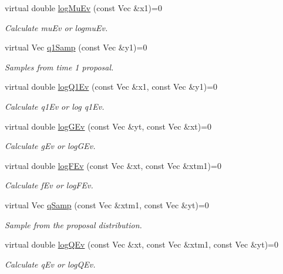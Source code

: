 \begin{DoxyCompactItemize}
virtual double \hyperlink{classSISRFilter_ab6ffa8e1cdee34f1afb825e35462afaa}{log\+Mu\+Ev} (const Vec \&x1)=0
\begin{DoxyCompactList}\small\item\em Calculate mu\+Ev or logmu\+Ev. \end{DoxyCompactList}\item 
virtual Vec \hyperlink{classSISRFilter_a5a57cd67535e31bb1ab20fb42499f911}{q1\+Samp} (const Vec \&y1)=0
\begin{DoxyCompactList}\small\item\em Samples from time 1 proposal. \end{DoxyCompactList}\item 
virtual double \hyperlink{classSISRFilter_a61a1971bd8208abbe3ccbacd66d35c23}{log\+Q1\+Ev} (const Vec \&x1, const Vec \&y1)=0
\begin{DoxyCompactList}\small\item\em Calculate q1\+Ev or log q1\+Ev. \end{DoxyCompactList}\item 
virtual double \hyperlink{classSISRFilter_aac59b077648fa74d2a5db970e3d7ffac}{log\+G\+Ev} (const Vec \&yt, const Vec \&xt)=0
\begin{DoxyCompactList}\small\item\em Calculate g\+Ev or log\+G\+Ev. \end{DoxyCompactList}\item 
virtual double \hyperlink{classSISRFilter_ab91474fc79efb84ed1dafbc8c542f59e}{log\+F\+Ev} (const Vec \&xt, const Vec \&xtm1)=0
\begin{DoxyCompactList}\small\item\em Calculate f\+Ev or log\+F\+Ev. \end{DoxyCompactList}\item 
virtual Vec \hyperlink{classSISRFilter_a2c480a10cac8b52a36ab1309cf9ea1a4}{q\+Samp} (const Vec \&xtm1, const Vec \&yt)=0
\begin{DoxyCompactList}\small\item\em Sample from the proposal distribution. \end{DoxyCompactList}\item 
virtual double \hyperlink{classSISRFilter_af289db59b008a0ab795fc3b8e9887043}{log\+Q\+Ev} (const Vec \&xt, const Vec \&xtm1, const Vec \&yt)=0
\begin{DoxyCompactList}\small\item\em Calculate q\+Ev or log\+Q\+Ev. \end{DoxyCompactList}\end{DoxyCompactItemize}


